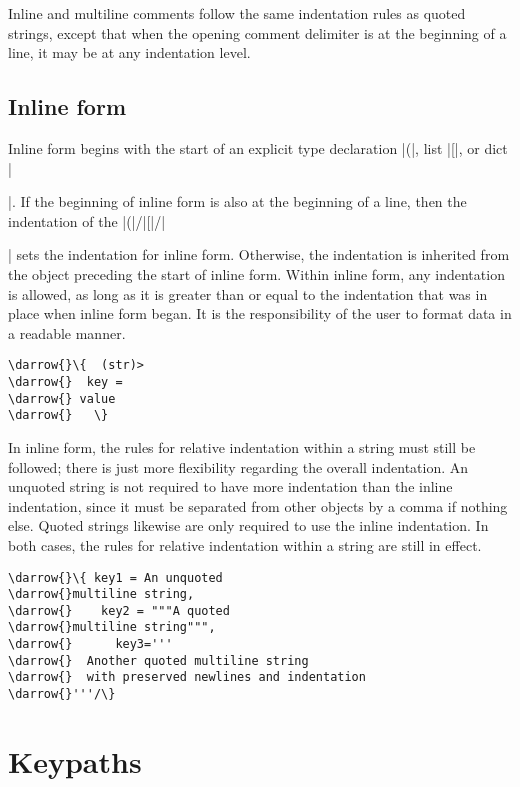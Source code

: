 \documentclass[11pt]{article}
\newcommand{\darrow}{\ensuremath{\textcolor{DarkGreen}{\downarrow}}}
\begin{document}
Inline and multiline comments follow the same indentation rules as quoted strings, except that when the opening comment delimiter is at the beginning of a line, it may be at any indentation level.

\subsection{Inline form}

Inline form begins with the start of an explicit type declaration |(|, list |[|, or dict |{|.  If the beginning of inline form is also at the beginning of a line, then the indentation of the |(|/|[|/|{| sets the indentation for inline form.  Otherwise, the indentation is inherited from the object preceding the start of inline form.  Within inline form, any indentation is allowed, as long as it is greater than or equal to the indentation that was in place when inline form began.  It is the responsibility of the user to format data in a readable manner.
\begin{Verbatim}[commandchars=\\\{\}]
\darrow{}\{  (str)>
\darrow{}  key = 
\darrow{} value
\darrow{}   \}
\end{Verbatim}

In inline form, the rules for relative indentation within a string must still be followed; there is just more flexibility regarding the overall indentation.  An unquoted string is not required to have more indentation than the inline indentation, since it must be separated from other objects by a comma if nothing else.  Quoted strings likewise are only required to use the inline indentation.  In both cases, the rules for relative indentation within a string are still in effect.
\begin{Verbatim}[commandchars=\\\{\}]
\darrow{}\{ key1 = An unquoted
\darrow{}multiline string,
\darrow{}    key2 = """A quoted
\darrow{}multiline string""",
\darrow{}      key3='''
\darrow{}  Another quoted multiline string
\darrow{}  with preserved newlines and indentation
\darrow{}'''/\}
\end{Verbatim}




\section{Keypaths}
\label{sec:keypath}

}}
\end{document}
